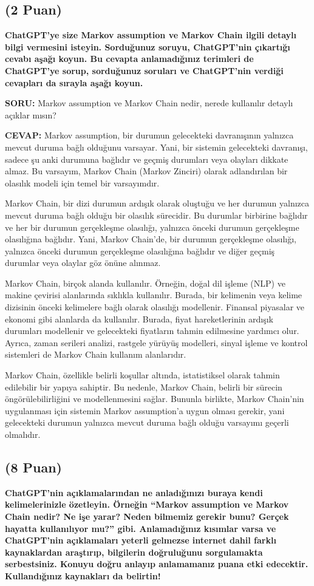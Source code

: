 \documentclass[11pt]{article}
\begin{document}
\subsection{(2 Puan)} \textbf{ChatGPT’ye size Markov assumption ve Markov Chain ilgili detaylı bilgi vermesini isteyin. Sorduğunuz soruyu, ChatGPT'nin çıkartığı cevabı aşağı koyun. Bu cevapta anlamadığınız terimleri de ChatGPT’ye sorup, sorduğunuz soruları ve ChatGPT’nin verdiği cevapları da sırayla aşağı koyun.}

\textbf{SORU:}  Markov assumption ve Markov Chain nedir, nerede kullanılır detaylı açıklar mısın?

\textbf{CEVAP:} Markov assumption, bir durumun gelecekteki davranışının yalnızca mevcut duruma bağlı olduğunu varsayar. Yani, bir sistemin gelecekteki davranışı, sadece şu anki durumuna bağlıdır ve geçmiş durumları veya olayları dikkate almaz. Bu varsayım, Markov Chain (Markov Zinciri) olarak adlandırılan bir olasılık modeli için temel bir varsayımdır.

Markov Chain, bir dizi durumun ardışık olarak oluştuğu ve her durumun yalnızca mevcut duruma bağlı olduğu bir olasılık sürecidir. Bu durumlar birbirine bağlıdır ve her bir durumun gerçekleşme olasılığı, yalnızca önceki durumun gerçekleşme olasılığına bağlıdır. Yani, Markov Chain'de, bir durumun gerçekleşme olasılığı, yalnızca önceki durumun gerçekleşme olasılığına bağlıdır ve diğer geçmiş durumlar veya olaylar göz önüne alınmaz.

Markov Chain, birçok alanda kullanılır. Örneğin, doğal dil işleme (NLP) ve makine çevirisi alanlarında sıklıkla kullanılır. Burada, bir kelimenin veya kelime dizisinin önceki kelimelere bağlı olarak olasılığı modellenir. Finansal piyasalar ve ekonomi gibi alanlarda da kullanılır. Burada, fiyat hareketlerinin ardışık durumları modellenir ve gelecekteki fiyatların tahmin edilmesine yardımcı olur. Ayrıca, zaman serileri analizi, rastgele yürüyüş modelleri, sinyal işleme ve kontrol sistemleri de Markov Chain kullanım alanlarıdır.

Markov Chain, özellikle belirli koşullar altında, istatistiksel olarak tahmin edilebilir bir yapıya sahiptir. Bu nedenle, Markov Chain, belirli bir sürecin öngörülebilirliğini ve modellenmesini sağlar. Bununla birlikte, Markov Chain'nin uygulanması için sistemin Markov assumption'a uygun olması gerekir, yani gelecekteki durumun yalnızca mevcut duruma bağlı olduğu varsayımı geçerli olmalıdır.

\subsection{(8 Puan)} \textbf{ChatGPT’nin açıklamalarından ne anladığınızı buraya kendi kelimelerinizle özetleyin. Örneğin ``Markov assumption ve Markov Chain nedir? Ne işe yarar? Neden bilmemiz gerekir bunu? Gerçek hayatta kullanılıyor mu?'' gibi. Anlamadığınız kısımlar varsa ve ChatGPT’nin açıklamaları yeterli gelmezse internet dahil farklı kaynaklardan araştırıp, bilgilerin doğruluğunu sorgulamakta serbestsiniz. Konuyu doğru anlayıp anlamamanız puana etki edecektir. Kullandığınız kaynakları da belirtin!}
\end{document}

